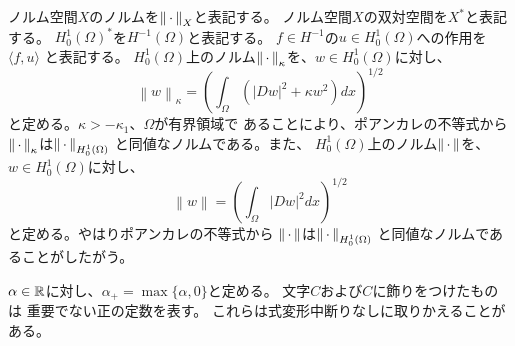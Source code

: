 ノルム空間$X$のノルムを$\left\|\, \cdot \, \right\|_X$と表記する。
ノルム空間$X$の双対空間を$X^*$と表記する。
$H_0^1(\Omega)^*$を$H^{-1}(\Omega)$と表記する。
$f \in H^{-1}$の$u \in H_0^1(\Omega)$への作用を$\langle f, u \rangle$
と表記する。
$H_0^1(\Omega)$上のノルム$\left\|\, \cdot \, \right\|_{\kappa}$を、$w \in H_0^1(\Omega)$に対し、
\[
 \left\| w \right\|_\kappa = \left(\int_\Omega \left( \lvert Dw \rvert^2 +
 \kappa w ^2 \right) dx\right)^{1/2}
\]
と定める。$\kappa > -\kappa_1$、$\Omega$が有界領域で
あることにより、ポアンカレの不等式から
$\left\|\, \cdot \, \right\|_\kappa$は$\left\|\, \cdot \, \right\|_{H_0^1(\Omega)}$
と同値なノルムである。また、
$H_0^1(\Omega)$上のノルム$\left\|\, \cdot \, \right\|$を、$w \in H_0^1(\Omega)$に対し、
\[
 \left\| w \right\| = \left(\int_\Omega \lvert Dw \rvert^2 dx\right)^{1/2}
\]
と定める。やはりポアンカレの不等式から
$\left\|\, \cdot \, \right\|$は$\left\|\, \cdot \, \right\|_{H_0^1(\Omega)}$
と同値なノルムであることがしたがう。

$\alpha \in \mathbb{R}$に対し、$\alpha_+ = \max \{ \alpha, 0 \}$と定める。
文字$C$および$C$に飾りをつけたものは
重要でない正の定数を表す。
これらは式変形中断りなしに取りかえることがある。

